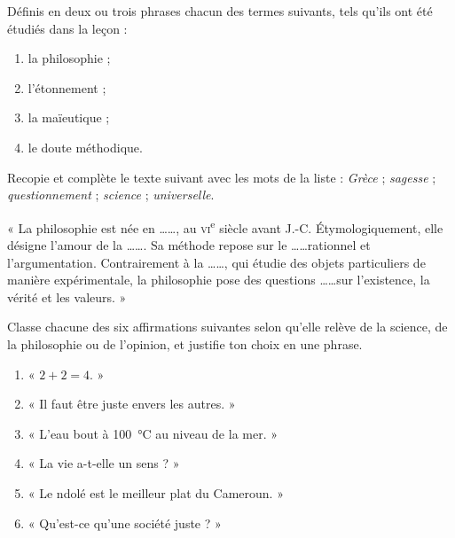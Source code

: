 \documentclass[11pt]{article}
\newcommand{\cle}[1]{{\popxbold\color{popdark}#1}}
\newcounter{popsec}
\newcounter{popsub}
\newcommand{\courssub}[1]{%
  \stepcounter{popsub}%
  \par\vspace{9pt}\noindent{\popxbold\fontsize{11.5}{13}\selectfont\color{popink}{\color{poporange}\thepopsec.\thepopsub}\hspace{6pt}#1}\par\nopagebreak\vspace{4pt}
}
\begin{document}
\begin{exercice}[Définitions]
Définis en deux ou trois phrases chacun des termes suivants, tels qu'ils ont été étudiés dans la leçon :
\begin{enumerate}
\item la philosophie ;
\item l'étonnement ;
\item la maïeutique ;
\item le doute méthodique.
\end{enumerate}
\end{exercice}

\begin{exercice}[Complétion]
Recopie et complète le texte suivant avec les mots de la liste : \emph{Grèce} ; \emph{sagesse} ; \emph{questionnement} ; \emph{science} ; \emph{universelle}.

« La philosophie est née en \dots\dots, au \textsc{vi}\textsuperscript{e} siècle avant J.-C. Étymologiquement, elle désigne l'amour de la \dots\dots. Sa méthode repose sur le \dots\dots rationnel et l'argumentation. Contrairement à la \dots\dots, qui étudie des objets particuliers de manière expérimentale, la philosophie pose des questions \dots\dots sur l'existence, la vérité et les valeurs. »
\end{exercice}

\courssub{Je m'entraîne}

\begin{exercice}
Classe chacune des six affirmations suivantes selon qu'elle relève de la \cle{science}, de la \cle{philosophie} ou de l'\cle{opinion}, et justifie ton choix en une phrase.
\begin{enumerate}
\item « $2+2=4$. »
\item « Il faut être juste envers les autres. »
\item « L'eau bout à \SI{100}{\celsius} au niveau de la mer. »
\item « La vie a-t-elle un sens ? »
\item « Le ndolé est le meilleur plat du Cameroun. »
\item « Qu'est-ce qu'une société juste ? »
\end{enumerate}
\end{exercice}
\end{document}
